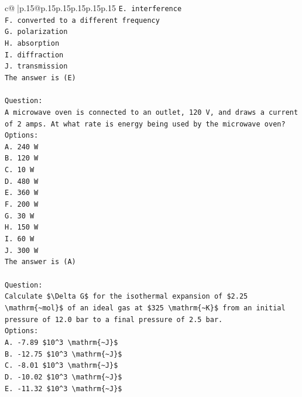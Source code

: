 \documentclass{article}
\begin{document}
{\begin{supertabular}{c@{$\;$}|p{.15\linewidth}@{}p{.15\linewidth}p{.15\linewidth}p{.15\linewidth}p{.15\linewidth}p{.15\linewidth}}
{{{\texttt{E. interference} \\
\texttt{F. converted to a different frequency} \\
\texttt{G. polarization} \\
\texttt{H. absorption} \\
\texttt{I. diffraction} \\
\texttt{J. transmission} \\
\texttt{The answer is (E)} \\
\\ 
\texttt{Question:} \\
\texttt{A microwave oven is connected to an outlet, 120 V, and draws a current of 2 amps. At what rate is energy being used by the microwave oven?} \\
\texttt{Options:} \\
\texttt{A. 240 W} \\
\texttt{B. 120 W} \\
\texttt{C. 10 W} \\
\texttt{D. 480 W} \\
\texttt{E. 360 W} \\
\texttt{F. 200 W} \\
\texttt{G. 30 W} \\
\texttt{H. 150 W} \\
\texttt{I. 60 W} \\
\texttt{J. 300 W} \\
\texttt{The answer is (A)} \\
\\ 
\texttt{Question:} \\
\texttt{Calculate \$\textbackslash{}Delta G\$ for the isothermal expansion of \$2.25 \textbackslash{}mathrm\{\textasciitilde{}mol\}\$ of an ideal gas at \$325 \textbackslash{}mathrm\{\textasciitilde{}K\}\$ from an initial pressure of 12.0 bar to a final pressure of 2.5 bar.} \\
\texttt{Options:} \\
\texttt{A. {-}7.89 \$10\^{}3 \textbackslash{}mathrm\{\textasciitilde{}J\}\$} \\
\texttt{B. {-}12.75 \$10\^{}3 \textbackslash{}mathrm\{\textasciitilde{}J\}\$} \\
\texttt{C. {-}8.01 \$10\^{}3 \textbackslash{}mathrm\{\textasciitilde{}J\}\$} \\
\texttt{D. {-}10.02 \$10\^{}3 \textbackslash{}mathrm\{\textasciitilde{}J\}\$} \\
\texttt{E. {-}11.32 \$10\^{}3 \textbackslash{}mathrm\{\textasciitilde{}J\}\$} \\
}}}
\end{supertabular}}
\end{document}
